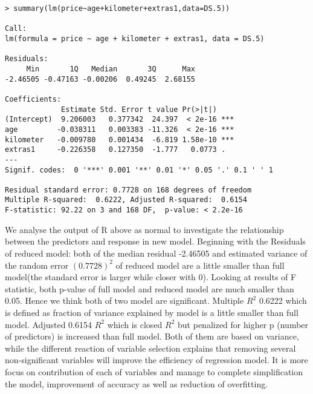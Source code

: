 \documentclass[a4paper]{article}
\begin{document}
\begin{verbatim}
> summary(lm(price~age+kilometer+extras1,data=DS.5))

Call:
lm(formula = price ~ age + kilometer + extras1, data = DS.5)

Residuals:
     Min       1Q   Median       3Q      Max
-2.46505 -0.47163 -0.00206  0.49245  2.68155

Coefficients:
             Estimate Std. Error t value Pr(>|t|)    
(Intercept)  9.206003   0.377342  24.397  < 2e-16 ***
age         -0.038311   0.003383 -11.326  < 2e-16 ***
kilometer   -0.009780   0.001434  -6.819 1.58e-10 ***
extras1     -0.226358   0.127350  -1.777   0.0773 .  
---
Signif. codes:  0 '***' 0.001 '**' 0.01 '*' 0.05 '.' 0.1 ' ' 1

Residual standard error: 0.7728 on 168 degrees of freedom
Multiple R-squared:  0.6222, Adjusted R-squared:  0.6154
F-statistic: 92.22 on 3 and 168 DF,  p-value: < 2.2e-16

\end{verbatim}

\noindent
We analyse the output of R above as normal to investigate the relationship between the predictors and response in new model. Beginning with the Residuals of reduced model: both of the median residual -2.46505 and estimated variance of the random error $(0.7728)^2$ of reduced model are a little smaller than full model(the standard error is larger while closer with 0). Looking at results of F statistic, both p-value of full model and reduced model are much smaller than 0.05. Hence we think both of two model are significant. Multiple $R^2$ 0.6222 which is defined as fraction of variance explained by model is a little smaller than full model. Adjusted 0.6154 $R^2$ which is closed $R^2$ but penalized for higher p (number of predictors) is increased than full model. Both of them are based on variance, while the different reaction of variable selection explains that removing several non-significant variables will improve the efficiency of regression model. It is more focus on contribution of each of variables and manage to complete simplification the model, improvement of accuracy as well as reduction of overfitting.\\
\end{document}
